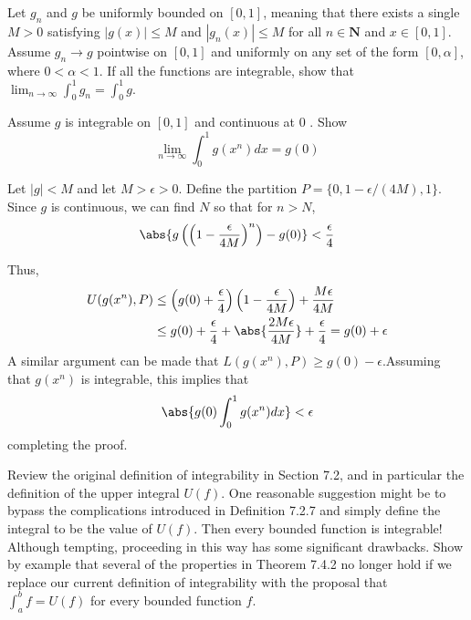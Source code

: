 \begin{exercise}
Let $g_{n}$ and $g$ be uniformly bounded on $[0,1]$, meaning that there exists a single $M>0$ satisfying $|g(x)| \leq M$ and $\left|g_{n}(x)\right| \leq M$ for all $n \in \mathbf{N}$ and $x \in[0,1]$. Assume $g_{n} \rightarrow g$ pointwise on $[0,1]$ and uniformly on any set of the form $[0, \alpha]$, where $0<\alpha<1$.
If all the functions are integrable, show that $\lim _{n \rightarrow \infty} \int_{0}^{1} g_{n}=\int_{0}^{1} g$.
\end{exercise}

\begin{solution}
    \TODO
\end{solution}

\begin{exercise} Assume $g$ is integrable on $[0,1]$ and continuous at 0 . Show
$$
\lim _{n \rightarrow \infty} \int_{0}^{1} g\left(x^{n}\right) d x=g(0)
$$
\end{exercise}
\begin{solution}
Let \(|g| < M\) and let \(M > \epsilon > 0\). Define the partition \(P = \{0, 1-\epsilon/(4M), 1\}\). Since \(g\) is continuous, we can find \(N\) so that for \(n > N\),
\[\abs{g\left(\left(1- \frac{\epsilon}{4M}\right)^n\right) - g(0)} < \frac{\epsilon}{4}\]

Thus,
\[\begin{aligned}
    U(g(x^n), P) &\leq \left(g(0) + \frac{\epsilon}{4}\right) \left(1-\frac{\epsilon}{4M}\right) + \frac{M\epsilon}{4M} \\
    &\leq g(0) + \frac{\epsilon}{4} + \abs{\frac{2M \epsilon}{4M}} + \frac{\epsilon}{4} = g(0) + \epsilon
\end{aligned}
    \]
    A similar argument can be made that \(L(g(x^n), P) \geq g(0) - \epsilon\).Assuming that \(g(x^n)\) is integrable, this implies that
    \[\abs{g(0) \int^1_0 g(x^n) dx} < \epsilon\]
completing the proof.
\end{solution}

\begin{exercise}
Review the original definition of integrability in Section 7.2, and in particular the definition of the upper integral $U(f)$. One reasonable suggestion might be to bypass the complications introduced in Definition 7.2.7 and simply define the integral to be the value of $U(f)$. Then every bounded function is integrable! Although tempting, proceeding in this way has some significant drawbacks. Show by example that several of the properties in Theorem 7.4.2 no longer hold if we replace our current definition of integrability with the proposal that $\int_{a}^{b} f=U(f)$ for every bounded function $f$.
\end{exercise}
\begin{solution}
    \TODO
\end{solution}
